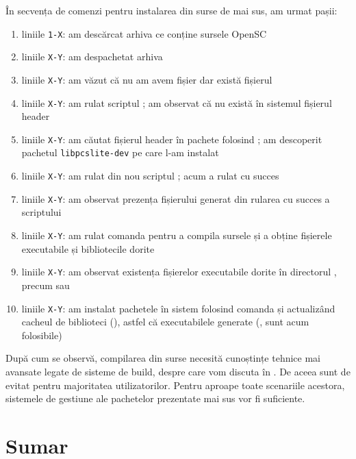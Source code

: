 În secvența de comenzi pentru instalarea din surse de mai sus, am urmat pașii:
\begin{enumerate}
  \item liniile \texttt{1-X}: am descărcat arhiva ce conține sursele OpenSC
  \item liniile \texttt{X-Y}: am despachetat arhiva
  \item liniile \texttt{X-Y}: am văzut că nu am avem fișier  dar există fișierul 
  \item liniile \texttt{X-Y}: am rulat scriptul ;
    am observat că nu există în sistemul fișierul header 
  \item liniile \texttt{X-Y}: am căutat fișierul header  în pachete folosind ;
    am descoperit pachetul \texttt{libpcslite-dev} pe care l-am instalat
  \item liniile \texttt{X-Y}: am rulat din nou scriptul ;
    acum a rulat cu succes
  \item liniile \texttt{X-Y}: am observat prezența fișierului  generat din rularea cu succes a scriptului 
  \item liniile \texttt{X-Y}: am rulat comanda  pentru a compila sursele și a obține fișierele executabile și bibliotecile dorite
  \item liniile \texttt{X-Y}: am observat existența fișierelor executabile dorite în directorul , precum  sau 
  \item liniile \texttt{X-Y}: am instalat pachetele în sistem folosind comanda  și actualizând cacheul de biblioteci (), astfel că executabilele generate (,  sunt acum folosibile)
\end{enumerate}

După cum se observă, compilarea din surse necesită cunoștințe tehnice mai avansate legate de sisteme de build, despre care vom discuta în .
De aceea sunt de evitat pentru majoritatea utilizatorilor.
Pentru aproape toate scenariile acestora, sistemele de gestiune ale pachetelor prezentate mai sus vor fi suficiente.

\section{Sumar}
\label{sec:package:summary}

